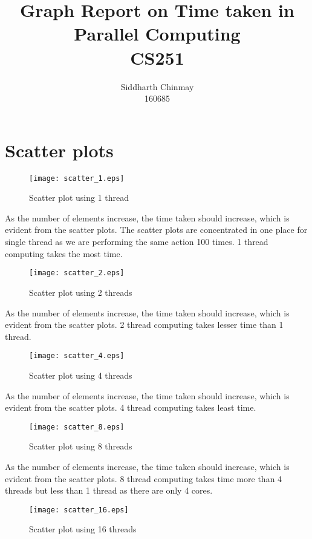 \documentclass[a4paper, 14pt]{report}
\title{Graph Report on Time taken in Parallel Computing\\CS251}
\author{Siddharth Chinmay\\160685}
\begin{document}
\maketitle

\chapter{Scatter plots}

\begin{figure}[H]
\centering
\texttt{[image: scatter\_1.eps]}
 \caption{Scatter plot using 1 thread}
\end{figure}

\vskip 0.5in
{\Large As the number of elements increase, the time taken should increase, which is evident from the scatter plots. The scatter plots are concentrated in one place for single thread as we are performing the same action 100 times. 1 thread computing takes the most time.}


\begin{figure}[H]
\centering
\texttt{[image: scatter\_2.eps]}
 \caption{Scatter plot using 2 threads}
 \label{fig:cc_get}
\end{figure}

\vskip 0.5in
{\Large As the number of elements increase, the time taken should increase, which is evident from the scatter plots. 2 thread computing takes lesser time than 1 thread.}

\begin{figure}[H]
\centering
\texttt{[image: scatter\_4.eps]}
 \caption{Scatter plot using 4 threads}
\end{figure}

\vskip 0.5in
{\Large As the number of elements increase, the time taken should increase, which is evident from the scatter plots. 4 thread computing takes least time.}

\begin{figure}[H]
\centering
\texttt{[image: scatter\_8.eps]}
 \caption{Scatter plot using 8 threads}
 \label{fig:cc_get}
\end{figure}

\vskip 0.5in
{\Large As the number of elements increase, the time taken should increase, which is evident from the scatter plots. 8 thread computing takes time more than 4 threads but less than 1 thread as there are only 4 cores.}

\begin{figure}[H]
\centering
\texttt{[image: scatter\_16.eps]}
 \caption{Scatter plot using 16 threads}
\end{figure}
\end{document}
